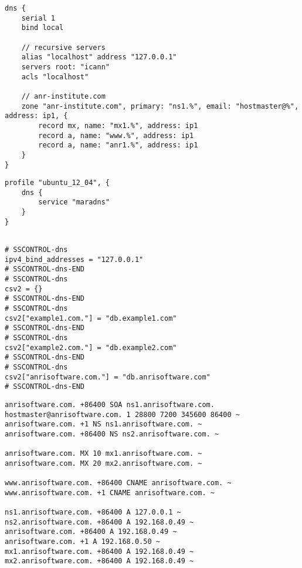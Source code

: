 \begin{lstlisting}[style=Java,label=lst:dns_example_script,
title={Dns example script.}]
dns {
    serial 1
    bind local

    // recursive servers
    alias "localhost" address "127.0.0.1"
    servers root: "icann"
    acls "localhost"

    // anr-institute.com
    zone "anr-institute.com", primary: "ns1.%", email: "hostmaster@%", address: ip1, {
        record mx, name: "mx1.%", address: ip1
        record a, name: "www.%", address: ip1
        record a, name: "anr1.%", address: ip1
    }
}
\end{lstlisting}

\begin{lstlisting}[style=Java,label=lst:dns_ubuntu_profile_min,
title={Minimal Ubuntu MaraDNS profile, only the DNS service type is needed. The other profile properties are set to default values.}]
profile "ubuntu_12_04", {
    dns {
        service "maradns"
    }
}
\end{lstlisting}

\begin{lstlisting}[style=rcfile_nonumbers,
label=lst:dns_mararc_example,
title={Example MaraDNS configuration file that is created from the DNS profile 
and script. The file is saved as /etc/maradns/mararc}]

# SSCONTROL-dns
ipv4_bind_addresses = "127.0.0.1"
# SSCONTROL-dns-END
# SSCONTROL-dns
csv2 = {}
# SSCONTROL-dns-END
# SSCONTROL-dns
csv2["example1.com."] = "db.example1.com"
# SSCONTROL-dns-END
# SSCONTROL-dns
csv2["example2.com."] = "db.example2.com"
# SSCONTROL-dns-END
# SSCONTROL-dns
csv2["anrisoftware.com."] = "db.anrisoftware.com"
# SSCONTROL-dns-END
\end{lstlisting}

\begin{lstlisting}[style=rcfile_nonumbers,
label=lst:dns_zone1_example,
title={Example MaraDNS zone configuration file that is created from the 
DNS script. The file is saved as /etc/maradns/db.anrisoftware.com}]
anrisoftware.com. +86400 SOA ns1.anrisoftware.com. hostmaster@anrisoftware.com. 1 28800 7200 345600 86400 ~
anrisoftware.com. +1 NS ns1.anrisoftware.com. ~
anrisoftware.com. +86400 NS ns2.anrisoftware.com. ~

anrisoftware.com. MX 10 mx1.anrisoftware.com. ~
anrisoftware.com. MX 20 mx2.anrisoftware.com. ~

www.anrisoftware.com. +86400 CNAME anrisoftware.com. ~
www.anrisoftware.com. +1 CNAME anrisoftware.com. ~

ns1.anrisoftware.com. +86400 A 127.0.0.1 ~
ns2.anrisoftware.com. +86400 A 192.168.0.49 ~
anrisoftware.com. +86400 A 192.168.0.49 ~
anrisoftware.com. +1 A 192.168.0.50 ~
mx1.anrisoftware.com. +86400 A 192.168.0.49 ~
mx2.anrisoftware.com. +86400 A 192.168.0.49 ~

\end{lstlisting}

